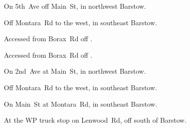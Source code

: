 
\begin{LocationList}

On 5th~Ave off  Main~St, in northwest Barstow.

Off Montara~Rd to the west, in southeast Barstow.

Accessed from Borax~Rd off .

Accessed from Borax~Rd off .

On 2nd~Ave at  Main~St, in northwest Barstow.

Off Montara~Rd to the west, in southeast Barstow.

On  Main~St at Montara~Rd, in southeast Barstow.

At the WP truck stop on Lenwood~Rd, off  south of Barstow.

\end{LocationList}

